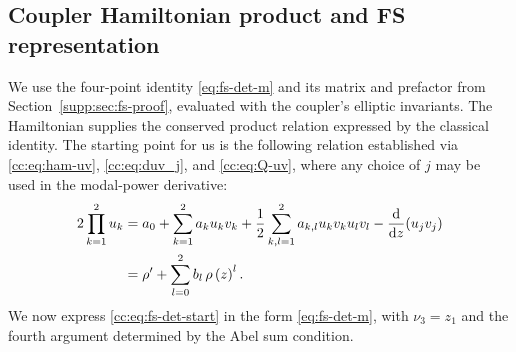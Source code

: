 \documentclass[11pt,a4paper]{article}
\begin{document}
\subsection{Coupler Hamiltonian product and FS representation}\label{cc:app:fs-det-ham-proof}
We use the four-point identity \eqref{eq:fs-det-m} and its matrix and prefactor from Section~\ref{supp:sec:fs-proof}, evaluated with the coupler's elliptic invariants.
The Hamiltonian supplies the conserved product relation expressed by the classical identity.
The starting point for us is the following relation established via \eqref{cc:eq:ham-uv}, \eqref{cc:eq:duv_j}, and \eqref{cc:eq:Q-uv}, where any choice of $j$ may be used in the modal-power derivative:
\begin{align}
2 \prod_{k=1}^{2} u_k &= {a}_{0} + \sum_{k=1}^{2} {a}_{k} u_k v_k  + \frac{1}{2}\sum\limits_{k,l=1}^{2} {a}_{k,l} u_k v_k u_l v_l - \frac{\mathrm{d}}{\mathrm{d} z}(u_j v_j) \notag \\
&=\rho' + \sum_{l=0}^{2}b_l\,\rho\left(z\right)^l. \label{cc:eq:fs-det-start}
\end{align}
We now express \eqref{cc:eq:fs-det-start} in the form \eqref{eq:fs-det-m}, with $\nu_3=z_1$ and the fourth argument determined by the Abel sum condition.
\end{document}
